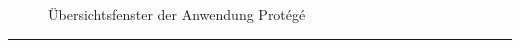 \begin{figure}[H]
\centering {}
\caption{Übersichtsfenster der Anwendung Protégé\label{fig:protege}\protect\footnotemark}
\end{figure}
\noindent\rule[1ex]{\textwidth}{1pt}

